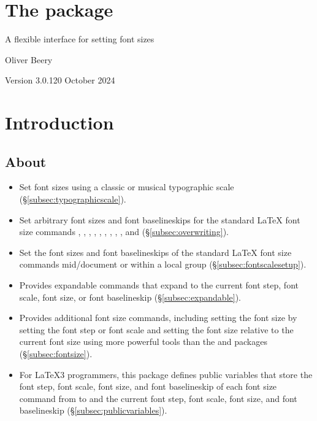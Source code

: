 \documentclass{beery}
\begin{document}
\section*
  {%
    The  package%
  }

A flexible interface for setting font sizes

Oliver Beery

Version 3.0.1\quad{}20 October 2024


\section{Introduction}
\label{sec:intro}

\subsection{About}
\label{subsec:about}

\begin{itemize}
  \item
  Set font sizes using a classic or musical typographic scale (\S\ref{subsec:typographicscale}).
  \item
  Set arbitrary font sizes and font baselineskips for the standard \LaTeX{} font size commands , , , , , , , , , and  (\S\ref{subsec:overwriting}).
  \item
  Set the font sizes and font baselineskips of the standard \LaTeX{} font size commands mid\-/document or within a local group (\S\ref{subsec:fontscalesetup}).
  \item
  Provides expandable commands that expand to the current font step, font scale, font size, or font baselineskip (\S\ref{subsec:expandable}).
  \item
  Provides additional font size commands, including setting the font size by setting the font step or font scale and setting the font size relative to the current font size using more powerful tools than the  and  packages (\S\ref{subsec:fontsize}).
  \item
  For \LaTeX3 programmers, this package defines public  variables that store the font step, font scale, font size, and font baselineskip of each font size command from  to  and the current font step, font scale, font size, and font baselineskip (\S\ref{subsec:publicvariables}).
\end{itemize}
\end{document}
